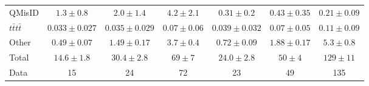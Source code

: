 \documentclass[cernpreprint, atlasdraft=false, texlive=2023, UKenglish, texmf, orcidlogo]{atlasdoc}
\begin{document}
\begin{table}[htbp]
\begin{center}
{\begin{tabular}{l|c|c|c|c|c|c}
QMisID                          & $1.3\pm0.8$       & $2.0\pm1.4$       & $4.2\pm2.1$       & $0.31\pm0.2$\phantom{0}      & $0.43\pm0.35$      &  $0.21\pm0.09$      \\
$t\bar{t}t\bar{t}$              & $0.033\pm0.027$   & $0.035\pm0.029$   & $0.07\pm0.06$   & $0.039\pm0.032$   & $0.07\pm0.05$    &  $0.11\pm0.09$      \\
Other                           & $0.49\pm0.07$     & $1.49\pm0.17$     & $3.7\pm0.4$       & $0.72\pm0.09$     & $1.88\pm0.17$      &  $5.3\pm0.8$        \\
\hline\hline
Total                           & $14.6\pm1.8$\phantom{0}  & $30.4\pm2.8$\phantom{0}  & $69\pm7$\phantom{0}  & $24.0\pm2.8$\phantom{0}  & $50\pm4$\phantom{0}  & $129\pm11$\phantom{0}         \\
\hline
Data                            & 15                & 24                & 72                & 23                & 49                 &  135                \\
\hline
\end{tabular}
}
\end{center}
\end{table}
 
\end{document}
